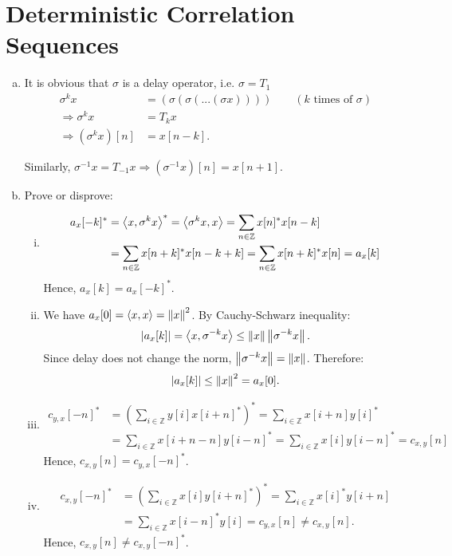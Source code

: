 \section{Deterministic Correlation Sequences}\label{sec:p1}

\begin{enumerate}[(a)]
\item It is obvious that $\sigma$ is a delay operator, i.e. $\sigma = T_1$
\begin{align*}
	\sigma^k x &= (\sigma(\sigma(...(\sigma x)))) \qquad (k \text{ times of } \sigma) \\
	\Rightarrow \sigma^k x &= T_k x \\
	\Rightarrow (\sigma ^k x)[n] &= x[n-k].
\end{align*}

Similarly, $\sigma^{-1} x = T_{-1} x \Rightarrow (\sigma^{-1} x)[n] = x[n+1]$.

\item Prove or disprove:
\begin{enumerate}[i.]
	\item \begin{align*}
		a_x[-k]^* &= \left\langle x, \sigma^k x \right\rangle^* = \left\langle \sigma^k x, x \right\rangle = \sum_{n \in \mathbb{Z}} x[n]^* x[n-k] \\
		&= \sum_{n \in \mathbb{Z}} x[n+k]^* x[n-k+k] = \sum_{n \in \mathbb{Z}} x[n+k]^* x[n] = a_x[k]
	\end{align*}
	Hence, $a_x[k] = a_x[-k]^*$.
	
	\item We have $a_x[0] = \left\langle x, x \right\rangle = \left\lVert x \right\rVert^2$.	By Cauchy-Schwarz inequality:
	\[\left\lvert a_x[k] \right\rvert = \left\langle x, \sigma^{-k}x \right\rangle \leq \left\lVert x \right\rVert \left\lVert \sigma^{-k}x \right\rVert.\]
	Since delay does not change the norm, $\left\lVert \sigma^{-k}x \right\rVert = \left\lVert x \right\rVert$. Therefore:
	\[\left\lvert a_x[k] \right\rvert \leq \left\lVert x \right\rVert^2 = a_x[0].\]
	
	\item \begin{align*}
		c_{y,x}[-n]^* &= \left(\sum_{i \in \mathbb{Z}} y[i] x[i+n]^*\right)^* = \sum_{i \in \mathbb{Z}} x[i+n]y[i]^* \\
		&= \sum_{i \in \mathbb{Z}} x[i+n-n]y[i-n]^* = \sum_{i \in \mathbb{Z}} x[i]y[i-n]^* = c_{x,y}[n]
	\end{align*}
	Hence, $c_{x,y}[n] = c_{y,x}[-n]^*$.
	
	\item \begin{align*}
		c_{x,y}[-n]^* &= \left(\sum_{i \in \mathbb{Z}} x[i] y[i+n]^*\right)^* = \sum_{i \in \mathbb{Z}} x[i]^*y[i+n] \\
		&= \sum_{i \in \mathbb{Z}} x[i-n]^*y[i] = c_{y,x}[n] \neq c_{x,y}[n].
	\end{align*}
	Hence, $c_{x,y}[n] \neq c_{x,y}[-n]^*$.
	

\end{enumerate}
\end{enumerate}

